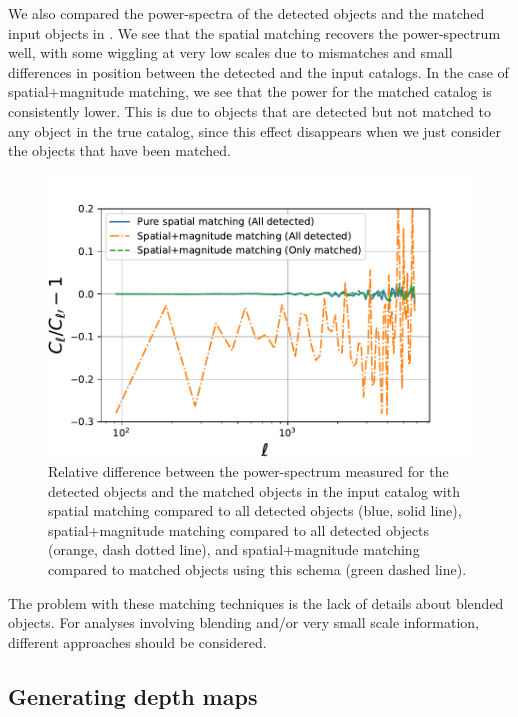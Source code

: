 \documentclass[twocolumn]{aastex62}
\begin{document}
We also compared the power-spectra of the detected objects and the matched input objects in . We see that the spatial matching recovers the power-spectrum well, with some wiggling at very low scales due to mismatches and small differences in position between the detected and the input catalogs. In the case of spatial+magnitude matching, we see that the power for the matched catalog is consistently lower. This is due to objects that are detected but not matched to any object in the true catalog, since this effect disappears when we just consider the objects that have been matched.

\begin{figure}
\centering
\includegraphics[width=0.9\columnwidth]{cl_comparison_matching.pdf}
\caption{Relative difference between the power-spectrum measured for the detected objects and the matched objects in the input catalog with spatial matching compared to all detected objects (blue, solid line), spatial+magnitude matching compared to all detected objects (orange, dash dotted line), and spatial+magnitude matching compared to matched objects using this schema (green dashed line).}
\label{fig:matching_cls}
\end{figure}

The problem with these matching techniques is the lack of details about blended objects. For analyses involving blending and/or very small scale information, different approaches should be considered.


\subsection{Generating depth maps}
\label{sec:masking}
\end{document}
